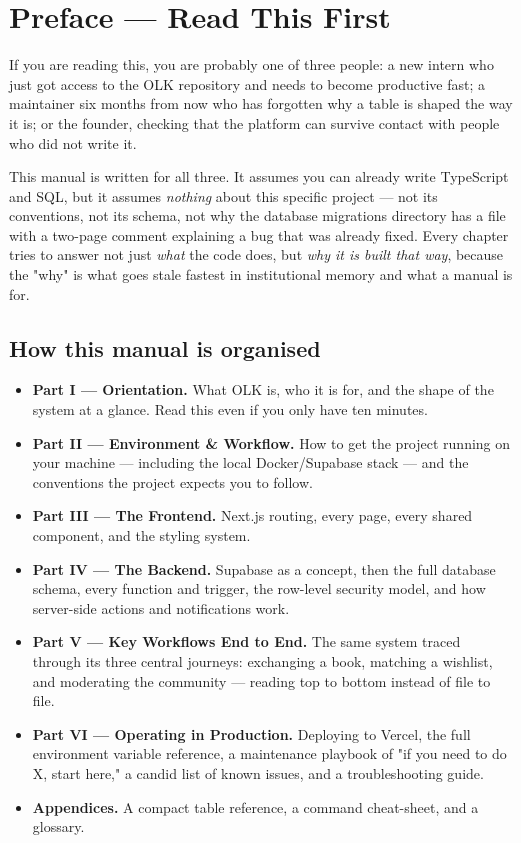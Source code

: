 \chapter*{Preface — Read This First}

If you are reading this, you are probably one of three people: a new intern who just got access to the OLK repository and needs to become productive fast; a maintainer six months from now who has forgotten why a table is shaped the way it is; or the founder, checking that the platform can survive contact with people who did not write it.

This manual is written for all three. It assumes you can already write TypeScript and SQL, but it assumes \emph{nothing} about this specific project — not its conventions, not its schema, not why the database migrations directory has a file with a two-page comment explaining a bug that was already fixed. Every chapter tries to answer not just \emph{what} the code does, but \emph{why it is built that way}, because the "why" is what goes stale fastest in institutional memory and what a manual is for.

\section*{How this manual is organised}

\begin{itemize}
  \item \textbf{Part I — Orientation.} What OLK is, who it is for, and the shape of the system at a glance. Read this even if you only have ten minutes.
  \item \textbf{Part II — Environment \& Workflow.} How to get the project running on your machine — including the local Docker/Supabase stack — and the conventions the project expects you to follow.
  \item \textbf{Part III — The Frontend.} Next.js routing, every page, every shared component, and the styling system.
  \item \textbf{Part IV — The Backend.} Supabase as a concept, then the full database schema, every function and trigger, the row-level security model, and how server-side actions and notifications work.
  \item \textbf{Part V — Key Workflows End to End.} The same system traced through its three central journeys: exchanging a book, matching a wishlist, and moderating the community — reading top to bottom instead of file to file.
  \item \textbf{Part VI — Operating in Production.} Deploying to Vercel, the full environment variable reference, a maintenance playbook of "if you need to do X, start here," a candid list of known issues, and a troubleshooting guide.
  \item \textbf{Appendices.} A compact table reference, a command cheat-sheet, and a glossary.
\end{itemize}

